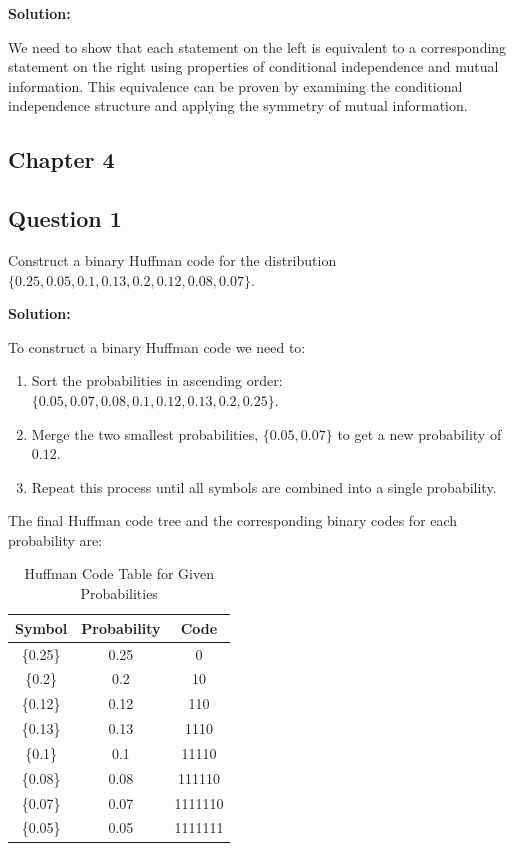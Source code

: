 \documentclass[a4paper,10pt]{article}
\begin{document}
\textbf{Solution:}

We need to show that each statement on the left is equivalent to a corresponding statement on the right using properties of conditional independence and mutual information. This equivalence can be proven by examining the conditional independence structure and applying the symmetry of mutual information.

\subsection{Chapter 4}

\subsection*{Question 1}
Construct a binary Huffman code for the distribution $\{0.25, 0.05, 0.1, 0.13, 0.2, 0.12, 0.08, 0.07\}$.

\textbf{Solution:}

To construct a binary Huffman code we need to:

\begin{enumerate}
    \item Sort the probabilities in ascending order: $\{0.05, 0.07, 0.08, 0.1, 0.12, 0.13, 0.2, 0.25\}$.
    \item Merge the two smallest probabilities, $\{0.05, 0.07\}$ to get a new probability of $0.12$.
    \item Repeat this process until all symbols are combined into a single probability.
\end{enumerate}

The final Huffman code tree and the corresponding binary codes for each probability are:

\begin{table}[h!]
    \centering
    \begin{tabular}{|c|c|c|}
        \hline
        \textbf{Symbol} & \textbf{Probability} & \textbf{Code} \\
        \hline
        \{0.25\} & 0.25 & 0 \\
        \{0.2\} & 0.2 & 10 \\
        \{0.12\} & 0.12 & 110 \\
        \{0.13\} & 0.13 & 1110 \\
        \{0.1\} & 0.1 & 11110 \\
        \{0.08\} & 0.08 & 111110 \\
        \{0.07\} & 0.07 & 1111110 \\
        \{0.05\} & 0.05 & 1111111 \\
        \hline
    \end{tabular}
    \caption{Huffman Code Table for Given Probabilities}
    \label{tab:huffman_code}
\end{table}
\end{document}
